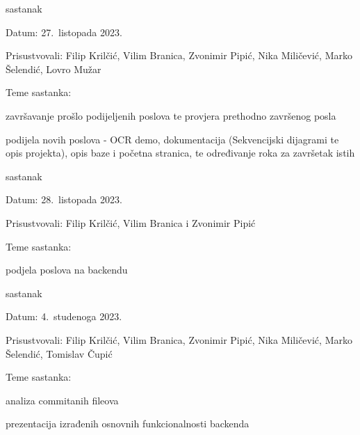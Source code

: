 \begin{packed_enum}
			\item  sastanak
			\item[] \begin{packed_item}
				\item Datum: 27.\ listopada 2023.
				\item Prisustvovali: Filip Krilčić, Vilim Branica, Zvonimir Pipić, Nika Miličević, Marko Šelendić, Lovro Mužar
				\item Teme sastanka:
				\begin{packed_item}
					\item  završavanje prošlo podijeljenih poslova te provjera prethodno završenog posla
					\item  podijela novih poslova - OCR demo, dokumentacija (Sekvencijski dijagrami te opis projekta), opis baze i početna stranica, te određivanje roka za završetak istih
				\end{packed_item}
			\end{packed_item}
			
			\item  sastanak
			\item[] \begin{packed_item}
				\item Datum: 28.\ listopada 2023.
				\item Prisustvovali: Filip Krilčić, Vilim Branica i Zvonimir Pipić
				\item Teme sastanka:
				\begin{packed_item}
					\item  podjela poslova na backendu
				\end{packed_item}
			\end{packed_item}
			
			\item  sastanak
			\item[] \begin{packed_item}
				\item Datum: 4.\ studenoga 2023.
				\item Prisustvovali: Filip Krilčić, Vilim Branica, Zvonimir Pipić, Nika Miličević, Marko Šelendić, Tomislav Čupić
				\item Teme sastanka:
				\begin{packed_item}
					\item  analiza commitanih fileova
					\item  prezentacija izrađenih osnovnih funkcionalnosti backenda
				\end{packed_item}
			\end{packed_item}

		\end{packed_enum}
		

